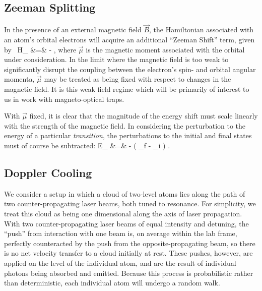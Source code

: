 \subsection{Zeeman Splitting}
\label{sec:zeemansplitting}
In the presence of an external magnetic field $\vec{B}$, the Hamiltonian associated with an atom's orbital electrons will acquire an additional ``Zeeman Shift'' term, given by~\cite{corney}
\bea
\label{zeeman_hamiltonian}
H_{} &=& - \vec{\mu}\cdot {},
\eea
where $\vec{\mu}$ is the magnetic moment associated with the orbital under consideration.  In the limit where the magnetic field is too weak to significantly disrupt the coupling between the electron's spin- and orbital angular momenta, $\vec{\mu}$ may be treated as being fixed with respect to changes in the magnetic field.  It is this weak field regime which will be primarily of interest to us in work with magneto-optical traps.


With $\vec{\mu}$ fixed, it is clear that the magnitude of the energy shift must scale linearly with the strength of the magnetic field.  In considering the perturbation to the energy of a particular \emph{transition}, the perturbations to the initial and final states must of course be subtracted:
\bea
\Delta E_{} &=& - \left( \vec{\mu}_f - \vec{\mu}_i \right) \cdot {}.
\eea 

\subsection{Doppler Cooling}
\label{sec:dopplercooling}
We consider a setup in which a cloud of two-level atoms lies along the path of two counter-propagating laser beams, both tuned to
resonance.  For simplicity, we treat this cloud as being one dimensional along the axis of laser propagation.  
With two counter-propagating laser beams of equal intensity and detuning,
the ``push'' from interaction with one beam is, on average within the lab frame, perfectly counteracted by the push from the opposite-propagating beam, so there is no net velocity transfer to a cloud initially at rest.  These pushes, however, are applied on the level of the individual atom, and are the result of individual photons being absorbed and emitted.  Because this process is probabilistic rather than deterministic, each individual atom will undergo a random walk.  

